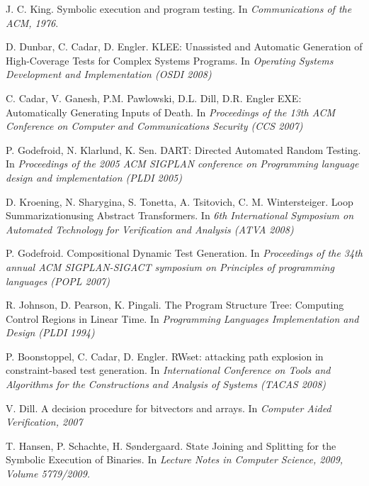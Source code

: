 \documentclass[12pt,a4paper]{article}
\begin{document}
\begin{thebibliography}{9}
         J. C. King.
         Symbolic execution and program testing.
         In \emph{Communications of the ACM, 1976}.

         D. Dunbar, C. Cadar, D. Engler. 
         KLEE: Unassisted and Automatic Generation of High-Coverage Tests for Complex Systems Programs.
         In \emph{Operating Systems Development and Implementation (OSDI 2008)}

          C. Cadar, V. Ganesh, P.M. Pawlowski, D.L. Dill, D.R. Engler
          EXE: Automatically Generating Inputs of Death.
      	  In\emph{ Proceedings of the 13th ACM Conference on Computer and Communications Security (CCS 2007)}
         
          P. Godefroid, N. Klarlund, K. Sen. 
          DART: Directed Automated Random Testing.
          In\emph{ Proceedings of the 2005 ACM SIGPLAN conference on Programming language design and implementation (PLDI 2005)}
	
        D. Kroening, N. Sharygina, S. Tonetta, A. Tsitovich, C. M. Wintersteiger.
        Loop Summarizationusing Abstract Transformers.
        In\emph{ 6th International Symposium on Automated Technology for Verification and Analysis (ATVA 2008)}

        P. Godefroid.
        Compositional Dynamic Test Generation.
        In\emph{ Proceedings of the 34th annual ACM SIGPLAN-SIGACT symposium on Principles of programming languages (POPL 2007)}
        
        R. Johnson, D. Pearson, K. Pingali.
        The Program Structure Tree: Computing Control Regions in Linear Time.
        In\emph{ Programming Languages Implementation and Design (PLDI 1994)}

        P. Boonstoppel, C. Cadar, D. Engler.
        RWset: attacking path explosion in constraint-based test generation.
        In\emph{ International Conference on Tools and Algorithms for the Constructions and Analysis of Systems (TACAS 2008)}
        
        V. Dill.
        A decision procedure for bitvectors and arrays.
        In\emph{ Computer Aided Verification, 2007}
        
        T. Hansen, P. Schachte, H. Søndergaard.
        State Joining and Splitting for the Symbolic Execution of Binaries.
        In\emph{ Lecture Notes in Computer Science, 2009, Volume 5779/2009.}
        

\end{thebibliography}
\end{document}

